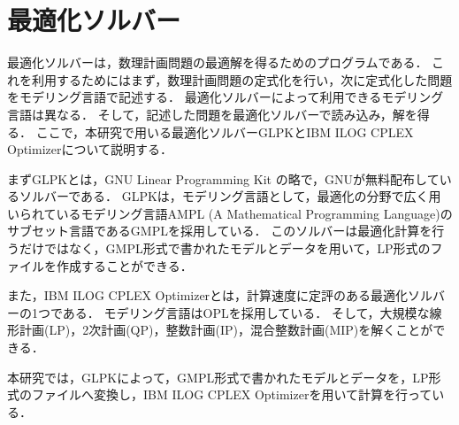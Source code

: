 \section{最適化ソルバー}

最適化ソルバーは，数理計画問題の最適解を得るためのプログラムである．
これを利用するためにはまず，数理計画問題の定式化を行い，次に定式化した問題をモデリング言語で記述する．
最適化ソルバーによって利用できるモデリング言語は異なる．
そして，記述した問題を最適化ソルバーで読み込み，解を得る．
ここで，本研究で用いる最適化ソルバーGLPK\cite{GLPK}とIBM ILOG CPLEX Optimizer\cite{CPLEX}について説明する．

まずGLPKとは，GNU Linear Programming Kit の略で，GNUが無料配布しているソルバーである．
GLPKは，モデリング言語として，最適化の分野で広く用いられているモデリング言語AMPL (A Mathematical Programming Language)\cite{AMPL}のサブセット言語であるGMPLを採用している．
このソルバーは最適化計算を行うだけではなく，GMPL形式で書かれたモデルとデータを用いて，LP形式のファイルを作成することができる．

また，IBM ILOG CPLEX Optimizer\cite{CPLEX}とは，計算速度に定評のある最適化ソルバーの1つである．
モデリング言語はOPLを採用している．
そして，大規模な線形計画(LP)，2次計画(QP)，整数計画(IP)，混合整数計画(MIP)を解くことができる．

本研究では，GLPKによって，GMPL形式で書かれたモデルとデータを，LP形式のファイルへ変換し，IBM ILOG CPLEX Optimizerを用いて計算を行っている．
